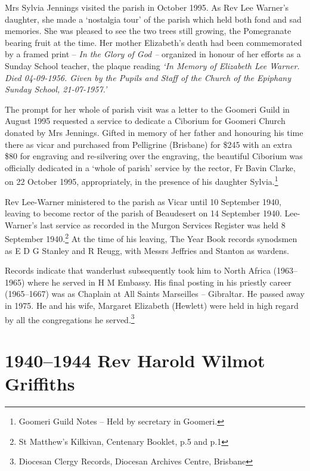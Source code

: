 Mrs Sylvia Jennings visited the parish in October 1995. As Rev Lee Warner's daughter, she made a `nostalgia tour' of the parish which held both fond and sad memories. She was pleased to see the two trees still growing, the Pomegranate bearing fruit at the time. Her mother Elizabeth's death had been commemorated by a framed print -- \emph{In the Glory of God --} organized in honour of her efforts as a Sunday School teacher, the plaque reading \emph{`In Memory of Elizabeth Lee Warner. Died 04-09-1956. Given by the Pupils and Staff of the Church of the Epiphany Sunday School, 21-07-1957.'}



The prompt for her whole of parish visit was a letter to the Goomeri Guild in August 1995 requested a service to dedicate a Ciborium for Goomeri Church donated by Mrs Jennings. Gifted in memory of her father and honouring his time there as vicar and purchased from Pelligrine (Brisbane) for \$245 with an extra \$80 for engraving and re-silvering over the engraving, the beautiful Ciborium was officially dedicated in a `whole of parish' service by the rector, Fr Bavin Clarke, on 22 October 1995, appropriately, in the presence of his daughter Sylvia.\footnote{Goomeri Guild Notes -- Held by secretary in Goomeri.}


Rev Lee-Warner ministered to the parish as Vicar until 10 September 1940, leaving to become rector of the parish of Beaudesert on 14 September 1940. Lee-Warner's last service as recorded in the Murgon Services Register was held 8 September 1940.\footnote{St Matthew's Kilkivan, Centenary Booklet, p.5 and p.1} At the time of his leaving, The Year Book records synodsmen as E D G Stanley and R Reugg, with Messrs Jeffries and Stanton as wardens.


Records indicate that wanderlust subsequently took him to North Africa (1963--1965) where he served in H M Embassy. His final posting in his priestly career (1965--1667) was as Chaplain at All Saints Marseilles -- Gibraltar. He passed away in 1975. He and his wife, Margaret Elizabeth (Hewlett) were held in high regard by all the congregations he served.\footnote{Diocesan Clergy Records, Diocesan Archives Centre, Brisbane}


\balance


\printendnotes[custom]
\setcounter{endnote}{0}
\chapter{1940--1944 Rev Harold Wilmot Griffiths}
\nobalance


